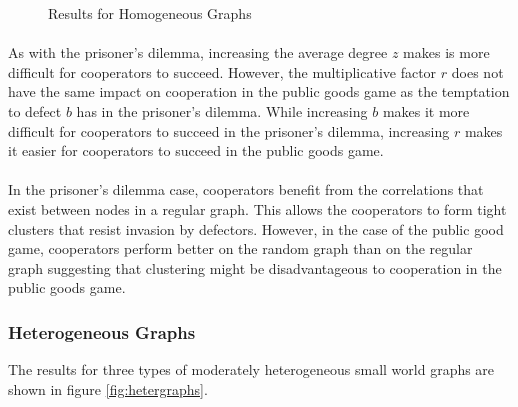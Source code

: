 \documentclass{article}
\begin{document}
\begin{figure}[h]
\begin{subfigure}[b]{0.4\textwidth}
			\caption{}
		\end{subfigure}
		\caption{Results for Homogeneous Graphs}
		\label{fig:homographs}
	\end{figure}

	\paragraph{}As with the prisoner's dilemma, increasing the average degree $z$ makes is more difficult for cooperators to succeed.  However, the multiplicative factor $r$ does not have the same impact on cooperation in the public goods game as the temptation to defect $b$ has in the prisoner's dilemma.  While increasing $b$ makes it more difficult for cooperators to succeed in the prisoner's dilemma, increasing $r$ makes it easier for cooperators to succeed in the public goods game.
	\paragraph{}In the prisoner's dilemma case, cooperators benefit from the correlations that exist between nodes in a regular graph.  This allows the cooperators to form tight clusters that resist invasion by defectors.  However, in the case of the public good game, cooperators perform better on the random graph than on the regular graph suggesting that clustering might be disadvantageous to cooperation in the public goods game.

	\subsubsection{Heterogeneous Graphs}
    The results for three types of moderately heterogeneous small world graphs are shown in figure \ref{fig:hetergraphs}.
\end{document}
